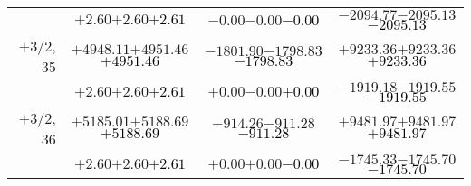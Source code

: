 \documentclass[compress]{beamer}
\begin{document}
\begin{frame}
{\begin{tabular}{r | c | c | c}
           & $+2.60$\hspace{0.1 cm}$+2.60$\hspace{0.1 cm}\textcolor{black}{$+2.61$} & $-0.00$\hspace{0.1 cm}$-0.00$\hspace{0.1 cm}\textcolor{black}{$-0.00$} & $-2094.77$\hspace{0.1 cm}$-2095.13$\hspace{0.1 cm}\textcolor{black}{$-2095.13$} \\
$+$3/2, 35 & $+4948.11$\hspace{0.1 cm}$+4951.46$\hspace{0.1 cm}\textcolor{black}{$+4951.46$} & $-1801.90$\hspace{0.1 cm}$-1798.83$\hspace{0.1 cm}\textcolor{black}{$-1798.83$} & $+9233.36$\hspace{0.1 cm}$+9233.36$\hspace{0.1 cm}\textcolor{black}{$+9233.36$} \\
           & $+2.60$\hspace{0.1 cm}$+2.60$\hspace{0.1 cm}\textcolor{black}{$+2.61$} & $+0.00$\hspace{0.1 cm}$-0.00$\hspace{0.1 cm}\textcolor{black}{$+0.00$} & $-1919.18$\hspace{0.1 cm}$-1919.55$\hspace{0.1 cm}\textcolor{black}{$-1919.55$} \\
$+$3/2, 36 & $+5185.01$\hspace{0.1 cm}$+5188.69$\hspace{0.1 cm}\textcolor{black}{$+5188.69$} & $-914.26$\hspace{0.1 cm}$-911.28$\hspace{0.1 cm}\textcolor{black}{$-911.28$} & $+9481.97$\hspace{0.1 cm}$+9481.97$\hspace{0.1 cm}\textcolor{black}{$+9481.97$} \\
           & $+2.60$\hspace{0.1 cm}$+2.60$\hspace{0.1 cm}\textcolor{black}{$+2.61$} & $+0.00$\hspace{0.1 cm}$+0.00$\hspace{0.1 cm}\textcolor{black}{$-0.00$} & $-1745.33$\hspace{0.1 cm}$-1745.70$\hspace{0.1 cm}\textcolor{black}{$-1745.70$} \\
\end{tabular}}
\end{frame}
\end{document}
